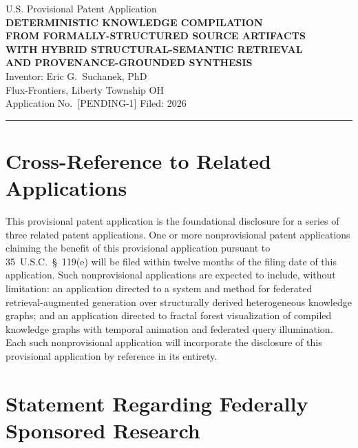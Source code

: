 \documentclass[12pt]{article}
\begin{document}

\begin{center}
  {\small U.S. Provisional Patent Application}\\[6pt]
  {\LARGE\bfseries DETERMINISTIC KNOWLEDGE COMPILATION\\
  FROM FORMALLY-STRUCTURED SOURCE ARTIFACTS\\
  WITH HYBRID STRUCTURAL-SEMANTIC RETRIEVAL\\
  AND PROVENANCE-GROUNDED SYNTHESIS}\\[12pt]
  {\normalsize Inventor: Eric G.\ Suchanek, PhD\\
  Flux-Frontiers, Liberty Township OH}\\[4pt]
  {\small Application No.\ [PENDING-1] \quad Filed: 2026}
\end{center}

\vspace{1em}\hrule\vspace{1em}

\section*{Cross-Reference to Related Applications}

This provisional patent application is the foundational disclosure for a series
of three related patent applications. One or more nonprovisional patent
applications claiming the benefit of this provisional application pursuant to
35~U.S.C.\ \S~119(e) will be filed within twelve months of the filing date of
this application. Such nonprovisional applications are expected to include,
without limitation: an application directed to a system and method for federated
retrieval-augmented generation over structurally derived heterogeneous knowledge
graphs; and an application directed to fractal forest visualization of compiled
knowledge graphs with temporal animation and federated query illumination. Each
such nonprovisional application will incorporate the disclosure of this
provisional application by reference in its entirety.

\section*{Statement Regarding Federally Sponsored Research}
\end{document}
